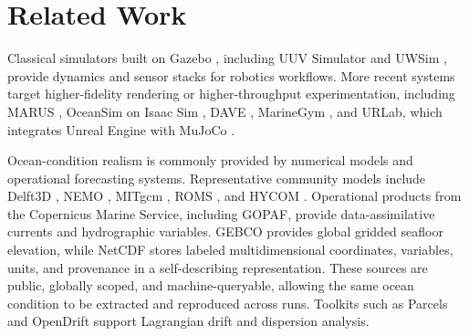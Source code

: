\section{Related Work}
\label{sec:related_work}

Classical simulators built on Gazebo \cite{Gazebo}, including UUV Simulator \cite{UUVSim} and UWSim \cite{UWSim}, provide dynamics and sensor stacks for robotics workflows. More recent systems target higher-fidelity rendering or higher-throughput experimentation, including MARUS \cite{MARUS}, OceanSim on Isaac Sim \cite{OceanSim,IsaacSim}, DAVE \cite{DAVE}, MarineGym \cite{MarineGym}, and URLab, which integrates Unreal Engine with MuJoCo \cite{URLab2026}. 

Ocean-condition realism is commonly provided by numerical models and operational forecasting systems. Representative community models include Delft3D \cite{delft3d}, NEMO \cite{nemo}, MITgcm \cite{MITgcm}, ROMS \cite{roms}, and HYCOM \cite{hycom}. Operational products from the Copernicus Marine Service, including GOPAF, provide data-assimilative currents and hydrographic variables. GEBCO provides global gridded seafloor elevation, while NetCDF stores labeled multidimensional coordinates, variables, units, and provenance in a self-describing representation. These sources are public, globally scoped, and machine-queryable, allowing the same ocean condition to be extracted and reproduced across runs. Toolkits such as Parcels \cite{parcels} and OpenDrift \cite{opendrift} support Lagrangian drift and dispersion analysis. 

